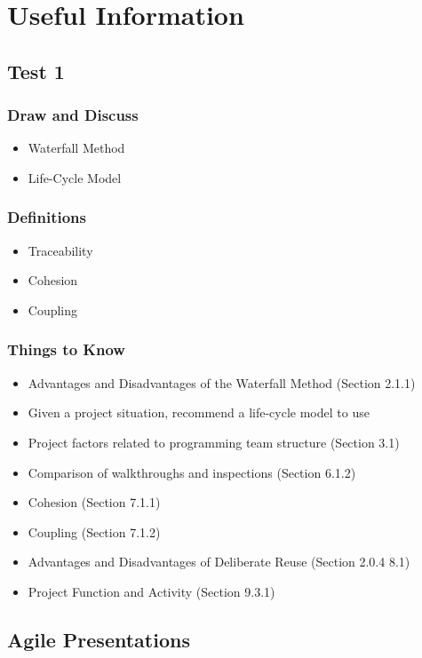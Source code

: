\documentclass{report}
\begin{document}
\part{Useful Information}
	\chapter{Test 1}
		\section{Draw and Discuss}
			\begin{itemize}
				\item Waterfall Method 
				\item Life-Cycle Model
			\end{itemize}
		\section{Definitions}
			\begin{itemize}
				\item Traceability
				\item Cohesion
				\item Coupling
			\end{itemize}
		\section{Things to Know}
			\begin{itemize}
				\item Advantages and Disadvantages of the Waterfall Method (Section 2.1.1)
				\item Given a project situation, recommend a life-cycle model to use
				\item Project factors related to programming team structure (Section 3.1)
				\item Comparison of walkthroughs and inspections (Section 6.1.2)
				\item Cohesion (Section 7.1.1)
				\item Coupling (Section 7.1.2)
				\item Advantages and Disadvantages of Deliberate Reuse (Section 2.0.4 8.1)
				\item Project Function and Activity (Section 9.3.1)
			\end{itemize}

	\chapter{Agile Presentations}
\end{document}
